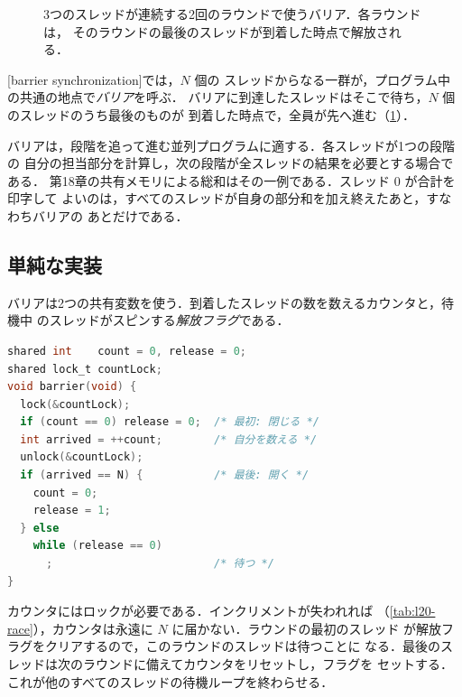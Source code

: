 \documentclass[../main.tex]{subfiles}
\begin{document}
\begin{figure}[htbp]
  \centering
  
  \caption{3つのスレッドが連続する2回のラウンドで使うバリア．各ラウンドは，
    そのラウンドの最後のスレッドが到着した時点で解放される．}
  \label{fig:l20-barrier}
\end{figure}

\begin{definition}[バリア同期]
  [barrier synchronization]では，$N$ 個の
  スレッドからなる一群が，プログラム中の共通の地点で\emph{バリア}を呼ぶ．
  バリアに到達したスレッドはそこで待ち，$N$ 個のスレッドのうち最後のものが
  到着した時点で，全員が先へ進む（\cref{fig:l20-barrier}）．
\end{definition}

バリアは，段階を追って進む並列プログラムに適する．各スレッドが1つの段階の
自分の担当部分を計算し，次の段階が全スレッドの結果を必要とする場合である．
第18章の共有メモリによる総和はその一例である．スレッド 0 が合計を印字して
よいのは，すべてのスレッドが自身の部分和を加え終えたあと，すなわちバリアの
あとだけである．

\subsection{単純な実装}

バリアは2つの共有変数を使う．到着したスレッドの数を数えるカウンタと，待機中
のスレッドがスピンする\emph{解放フラグ}である．
\begin{lstlisting}[language=C, numbers=none, morekeywords={shared}]
shared int    count = 0, release = 0;
shared lock_t countLock;
void barrier(void) {
  lock(&countLock);
  if (count == 0) release = 0;  /* 最初: 閉じる */
  int arrived = ++count;        /* 自分を数える */
  unlock(&countLock);
  if (arrived == N) {           /* 最後: 開く */
    count = 0;
    release = 1;
  } else
    while (release == 0)
      ;                         /* 待つ */
}
\end{lstlisting}
カウンタにはロックが必要である．インクリメントが失われれば
（\cref{tab:l20-race}），カウンタは永遠に $N$ に届かない．ラウンドの最初のスレッド
が解放フラグをクリアするので，このラウンドのスレッドは待つことに
なる．最後のスレッドは次のラウンドに備えてカウンタをリセットし，フラグを
セットする．これが他のすべてのスレッドの待機ループを終わらせる．
\end{document}
